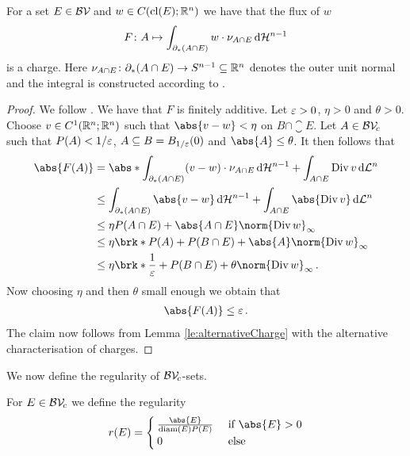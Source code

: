 \begin{claim}
For a set $E\in\mathcal{BV\!}$  and $w\in C(\operatorname{cl}(E);\mathbb{R}^n)$ we have that the flux of $w$
\begin{align*}
	F\colon A\mapsto \int_{\partial_*(A\cap E)}w\cdot\nu_{A\cap E}\,\mathrm{d} \mathcal{H}^{n-1}
\end{align*}
is a charge. Here $\nu_{A\cap E}\colon \partial_*(A\cap E)\to S^{n-1}\subseteq\mathbb{R}^n$ denotes the outer unit normal and the integral is constructed according to \cite[Chapter 2.3]{Coh2013}.
\end{claim}
\begin{proof}
We follow \cite[Example 2.1.4]{Pfe2001}.
We have that $F$ is finitely additive. Let $\varepsilon>0$, $\eta>0$ and $\theta>0$. Choose $v\in C^1(\mathbb{R}^n;\mathbb{R}^n)$ such that $\abs{v-w}<\eta$ on $B\cap\closure E$. Let $A\in\mathcal{BV\!}_c$ such that $P(A)<1/\varepsilon$, $A\subseteq B=B_{1/\varepsilon}(0)$ and $\abs{A}\leq \theta$. It then follows that
\begin{align*}
	\abs{F(A)}
	&= \abs*{\int_{\partial_*(A\cap E)}(v-w)\cdot\nu_{A\cap E}\dif\cH^{n-1}+\int_{A\cap E}\diver v\dif\cL^n} \\
	&\leq \int_{\partial_*(A\cap E)}\abs{v-w}\dif\cH^{n-1}+\int_{A\cap E}\abs{\diver v}\dif\cL^n \\
	&\leq \eta P(A\cap E)+\abs{A\cap E}\norm{\diver w}_\infty \\
	&\leq \eta \brk*{P(A)+P(B\cap E)}+\abs{A}\norm{\diver w}_\infty \\
	&\leq \eta\brk*{\frac{1}{\e}+P(B\cap E)}+\theta\norm{\diver w}_\infty\,.
\end{align*}
Now choosing $\eta$ and then $\theta$ small enough we obtain that
\begin{align*}
	\abs{F(A)}\leq \e\,.
\end{align*}
The claim now follows from Lemma \ref{le:alternativeCharge} with the alternative characterisation of charges.
\end{proof}

We now define the regularity of $\mathcal{BV\!}_c$-sets.

\begin{definition}
For $E\in \mathcal{BV\!}_c$ we define the regularity
\begin{align*}
	r(E)=\begin{cases}
		\frac{\abs{E}}{\diam(E)P(E)} &\text{ if }\abs{E}>0 \\
		0 &\text{ else}
	\end{cases}
\end{align*}
\end{definition}

